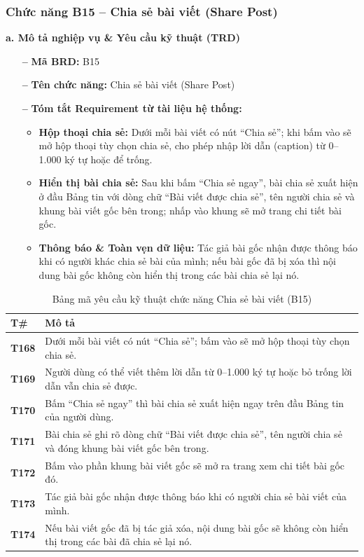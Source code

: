 \documentclass[11pt,a4paper]{article}
\begin{document}
\subsubsection{Chức năng B15 -- Chia sẻ bài viết (Share Post)}

\noindent\textbf{a. Mô tả nghiệp vụ \& Yêu cầu kỹ thuật (TRD)}
\begin{itemize}[leftmargin=1.2cm, noitemsep]
    \item[\textbf{--}] \textbf{Mã BRD:} B15
    \item[\textbf{--}] \textbf{Tên chức năng:} Chia sẻ bài viết (Share Post)
    \item[\textbf{--}] \textbf{Tóm tắt Requirement từ tài liệu hệ thống:}
    \begin{itemize}[leftmargin=0.8cm, label=$\ast$, noitemsep]
        \item \textbf{Hộp thoại chia sẻ:} Dưới mỗi bài viết có nút ``Chia sẻ''; khi bấm vào sẽ mở hộp thoại tùy chọn chia sẻ, cho phép nhập lời dẫn (caption) từ 0--1.000 ký tự hoặc để trống.
        \item \textbf{Hiển thị bài chia sẻ:} Sau khi bấm ``Chia sẻ ngay'', bài chia sẻ xuất hiện ở đầu Bảng tin với dòng chữ ``Bài viết được chia sẻ'', tên người chia sẻ và khung bài viết gốc bên trong; nhấp vào khung sẽ mở trang chi tiết bài gốc.
        \item \textbf{Thông báo \& Toàn vẹn dữ liệu:} Tác giả bài gốc nhận được thông báo khi có người khác chia sẻ bài của mình; nếu bài gốc đã bị xóa thì nội dung bài gốc không còn hiển thị trong các bài chia sẻ lại nó.
    \end{itemize}
\end{itemize}

\begin{table}[H]
\centering
\small
\begin{tabularx}{\textwidth}{|C{1.5cm}|X|}
\hline
{}
\textbf{T\#} & \textbf{Mô tả} \tabularnewline
\hline
\textbf{T168} & Dưới mỗi bài viết có nút ``Chia sẻ''; bấm vào sẽ mở hộp thoại tùy chọn chia sẻ. \\ \hline
\textbf{T169} & Người dùng có thể viết thêm lời dẫn từ 0--1.000 ký tự hoặc bỏ trống lời dẫn vẫn chia sẻ được. \\ \hline
\textbf{T170} & Bấm ``Chia sẻ ngay'' thì bài chia sẻ xuất hiện ngay trên đầu Bảng tin của người dùng. \\ \hline
\textbf{T171} & Bài chia sẻ ghi rõ dòng chữ ``Bài viết được chia sẻ'', tên người chia sẻ và đóng khung bài viết gốc bên trong. \\ \hline
\textbf{T172} & Bấm vào phần khung bài viết gốc sẽ mở ra trang xem chi tiết bài gốc đó. \\ \hline
\textbf{T173} & Tác giả bài gốc nhận được thông báo khi có người chia sẻ bài viết của mình. \\ \hline
\textbf{T174} & Nếu bài viết gốc đã bị tác giả xóa, nội dung bài gốc sẽ không còn hiển thị trong các bài đã chia sẻ lại nó. \\ \hline
\end{tabularx}
\caption{Bảng mã yêu cầu kỹ thuật chức năng Chia sẻ bài viết (B15)}
\end{table}
\end{document}

